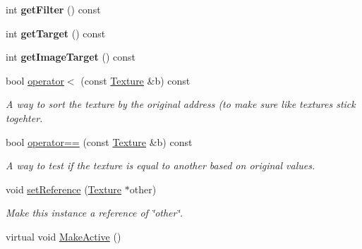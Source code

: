 \begin{DoxyCompactItemize}
\item 
int {\bfseries get\+Filter} () const \hypertarget{classTexture_acb7966f4de6d05b3a781dbf393da8545}{}\label{classTexture_acb7966f4de6d05b3a781dbf393da8545}

\item 
int {\bfseries get\+Target} () const \hypertarget{classTexture_aa158d6436ea204b3bc0550b856ec7e64}{}\label{classTexture_aa158d6436ea204b3bc0550b856ec7e64}

\item 
int {\bfseries get\+Image\+Target} () const \hypertarget{classTexture_aaebcc99c95b8c4d42e6d125815c62574}{}\label{classTexture_aaebcc99c95b8c4d42e6d125815c62574}

\item 
bool \hyperlink{classTexture_a1e091aa3df9fc30ecc304b196e30aed3}{operator$<$} (const \hyperlink{classTexture}{Texture} \&b) const \hypertarget{classTexture_a1e091aa3df9fc30ecc304b196e30aed3}{}\label{classTexture_a1e091aa3df9fc30ecc304b196e30aed3}

\begin{DoxyCompactList}\small\item\em A way to sort the texture by the original address (to make sure like textures stick togehter. \end{DoxyCompactList}\item 
bool \hyperlink{classTexture_a7f0ed892596465c2ae15198cb190d4e6}{operator==} (const \hyperlink{classTexture}{Texture} \&b) const \hypertarget{classTexture_a7f0ed892596465c2ae15198cb190d4e6}{}\label{classTexture_a7f0ed892596465c2ae15198cb190d4e6}

\begin{DoxyCompactList}\small\item\em A way to test if the texture is equal to another based on original values. \end{DoxyCompactList}\item 
void \hyperlink{classTexture_a55ace9fa6d4c6abf95e675da0b61eec0}{set\+Reference} (\hyperlink{classTexture}{Texture} $\ast$other)\hypertarget{classTexture_a55ace9fa6d4c6abf95e675da0b61eec0}{}\label{classTexture_a55ace9fa6d4c6abf95e675da0b61eec0}

\begin{DoxyCompactList}\small\item\em Make this instance a reference of \char`\"{}other\char`\"{}. \end{DoxyCompactList}\item 
virtual void \hyperlink{classTexture_a523bfee50afd5493517b766a7f2e3353}{Make\+Active} ()\hypertarget{classTexture_a523bfee50afd5493517b766a7f2e3353}{}\label{classTexture_a523bfee50afd5493517b766a7f2e3353}


\end{DoxyCompactItemize}
